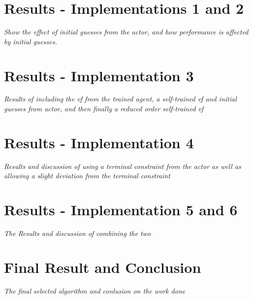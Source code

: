 \section{Results - Implementations 1 and 2}
\emph{Show the effect of initial guesses from the actor, and how performance is affected by initial guesses.}

\section{Results - Implementation 3}
\emph{Results of including the vf from the trained agent, a self-trained vf and initial guesses from actor, and then finally a reduced order self-trained vf}

\section{Results - Implementation 4}
\emph{Results and discussion of using a terminal constraint from the actor as well as allowing a slight deviation from the terminal constraint}

\section{Results - Implementation 5 and 6}
\emph{The Results and discussion of combining the two}

\section{Final Result and Conclusion}
\emph{The final selected algorithm and conlusion on the work done}

